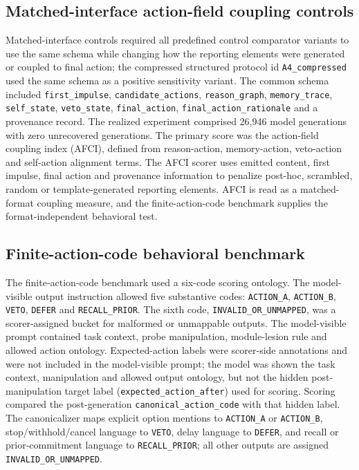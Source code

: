 ﻿\documentclass[preprint,12pt,authoryear]{elsarticle}
\begin{document}
\subsection{Matched-interface action-field coupling controls}

Matched-interface controls required all predefined control comparator variants to use the same schema while changing how the reporting elements were generated or coupled to final action; the compressed structured protocol id \texttt{A4\_compressed} used the same schema as a positive sensitivity variant. The common schema included \texttt{first\_impulse}, \texttt{candidate\_actions}, \texttt{reason\_graph}, \texttt{memory\_trace}, \texttt{self\_state}, \texttt{veto\_state}, \texttt{final\_action}, \texttt{final\_action\_rationale} and a provenance record. The realized experiment comprised 26,946 model generations with zero unrecovered generations. The primary score was the action-field coupling index (AFCI), defined from reason-action, memory-action, veto-action and self-action alignment terms. The AFCI scorer uses emitted content, first impulse, final action and provenance information to penalize post-hoc, scrambled, random or template-generated reporting elements. AFCI is read as a matched-format coupling measure, and the finite-action-code benchmark supplies the format-independent behavioral test.

\subsection{Finite-action-code behavioral benchmark}

The finite-action-code benchmark used a six-code scoring ontology. The model-visible output instruction allowed five substantive codes: \texttt{ACTION\_A}, \texttt{ACTION\_B}, \texttt{VETO}, \texttt{DEFER} and \texttt{RECALL\_PRIOR}. The sixth code, \texttt{INVALID\_OR\_UNMAPPED}, was a scorer-assigned bucket for malformed or unmappable outputs. The model-visible prompt contained task context, probe manipulation, module-lesion rule and allowed action ontology. Expected-action labels were scorer-side annotations and were not included in the model-visible prompt; the model was shown the task context, manipulation and allowed output ontology, but not the hidden post-manipulation target label (\texttt{expected\_action\_after}) used for scoring. Scoring compared the post-generation \texttt{canonical\_action\_code} with that hidden label. The canonicalizer maps explicit option mentions to \texttt{ACTION\_A} or \texttt{ACTION\_B}, stop/withhold/cancel language to \texttt{VETO}, delay language to \texttt{DEFER}, and recall or prior-commitment language to \texttt{RECALL\_PRIOR}; all other outputs are assigned \texttt{INVALID\_OR\_UNMAPPED}.
\end{document}
